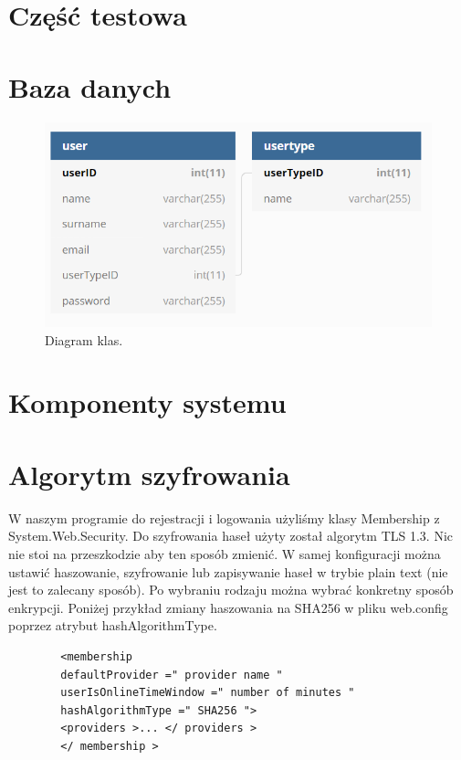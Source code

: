 \documentclass[12pt,a4paper]{article}
\begin{document}
\section*{Część testowa}
	
\section*{Baza danych}
\begin{figure}[h]
	\centering
	\centerline{
	\includegraphics[width=0.9\linewidth]{media/dbdiagram}
	}
	\caption{Diagram klas.}
	\label{fig:dbdiagram}
\end{figure}



\section*{Komponenty systemu}
	
\section*{Algorytm szyfrowania}
	
	
	W naszym programie do rejestracji i logowania użyliśmy klasy Membership z System.Web.Security. Do szyfrowania haseł użyty został algorytm TLS 1.3. Nic nie stoi na przeszkodzie aby ten sposób zmienić. W samej konfiguracji można ustawić haszowanie, szyfrowanie lub zapisywanie haseł w trybie plain text (nie jest to zalecany sposób). Po wybraniu rodzaju można wybrać konkretny sposób enkrypcji. Poniżej przykład zmiany haszowania na SHA256 w pliku web.config poprzez atrybut hashAlgorithmType.
	
	\begin{lstlisting}
		<membership
		defaultProvider =" provider name "
		userIsOnlineTimeWindow =" number of minutes "
		hashAlgorithmType =" SHA256 ">
		<providers >... </ providers >
		</ membership >
	\end{lstlisting}
\end{document}
